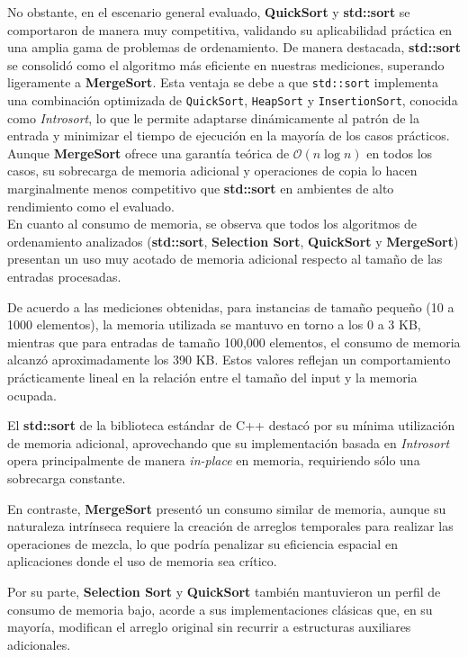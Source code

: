 No obstante, en el escenario general evaluado, \textbf{QuickSort} y \textbf{std::sort} se comportaron de manera muy competitiva, validando su aplicabilidad práctica en una amplia gama de problemas de ordenamiento. De manera destacada, \textbf{std::sort} se consolidó como el algoritmo más eficiente en nuestras mediciones, superando ligeramente a \textbf{MergeSort}. Esta ventaja se debe a que \texttt{std::sort} implementa una combinación optimizada de \texttt{QuickSort}, \texttt{HeapSort} y \texttt{InsertionSort}, conocida como \textit{Introsort}, lo que le permite adaptarse dinámicamente al patrón de la entrada y minimizar el tiempo de ejecución en la mayoría de los casos prácticos. Aunque \textbf{MergeSort} ofrece una garantía teórica de $\mathcal{O}(n \log n)$ en todos los casos, su sobrecarga de memoria adicional y operaciones de copia lo hacen marginalmente menos competitivo que \textbf{std::sort} en ambientes de alto rendimiento como el evaluado.
\\
En cuanto al consumo de memoria, se observa que todos los algoritmos de ordenamiento analizados (\textbf{std::sort}, \textbf{Selection Sort}, \textbf{QuickSort} y \textbf{MergeSort}) presentan un uso muy acotado de memoria adicional respecto al tamaño de las entradas procesadas.

De acuerdo a las mediciones obtenidas, para instancias de tamaño pequeño (10 a 1000 elementos), la memoria utilizada se mantuvo en torno a los 0 a 3 KB, mientras que para entradas de tamaño 100,000 elementos, el consumo de memoria alcanzó aproximadamente los 390 KB. Estos valores reflejan un comportamiento prácticamente lineal en la relación entre el tamaño del input y la memoria ocupada.

El \textbf{std::sort} de la biblioteca estándar de C++ destacó por su mínima utilización de memoria adicional, aprovechando que su implementación basada en \textit{Introsort} opera principalmente de manera \textit{in-place} en memoria, requiriendo sólo una sobrecarga constante. 

En contraste, \textbf{MergeSort} presentó un consumo similar de memoria, aunque su naturaleza intrínseca requiere la creación de arreglos temporales para realizar las operaciones de mezcla, lo que podría penalizar su eficiencia espacial en aplicaciones donde el uso de memoria sea crítico.

Por su parte, \textbf{Selection Sort} y \textbf{QuickSort} también mantuvieron un perfil de consumo de memoria bajo, acorde a sus implementaciones clásicas que, en su mayoría, modifican el arreglo original sin recurrir a estructuras auxiliares adicionales.

